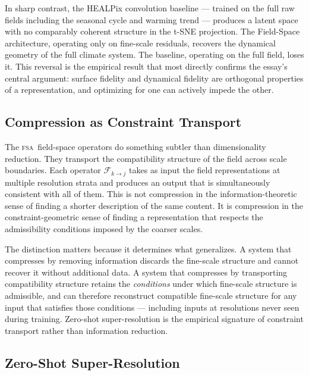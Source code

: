 \documentclass[11pt,a4paper]{article}
\theoremstyle{plain}
\theoremstyle{definition}
\theoremstyle{remark}
\newcommand{\FSA}{\textup{\textsc{fsa}}}
\begin{document}
In sharp contrast, the HEALPix convolution baseline --- trained on the full
raw fields including the seasonal cycle and warming trend --- produces a
latent space with no comparably coherent structure in the t-SNE projection.
The Field-Space architecture, operating only on fine-scale residuals,
recovers the dynamical geometry of the full climate system. The baseline,
operating on the full field, loses it. This reversal is the empirical result
that most directly confirms the essay's central argument: surface fidelity
and dynamical fidelity are orthogonal properties of a representation, and
optimizing for one can actively impede the other.

\subsection{Compression as Constraint Transport}

The \FSA\ field-space operators do something subtler than dimensionality
reduction. They transport the compatibility structure of the field across
scale boundaries. Each operator $\mathcal{F}_{k \to j}$ takes as input the
field representations at multiple resolution strata and produces an output
that is simultaneously consistent with all of them. This is not compression
in the information-theoretic sense of finding a shorter description of the
same content. It is compression in the constraint-geometric sense of finding
a representation that respects the admissibility conditions imposed by the
coarser scales.

The distinction matters because it determines what generalizes. A system
that compresses by removing information discards the fine-scale structure
and cannot recover it without additional data. A system that compresses by
transporting compatibility structure retains the \textit{conditions} under
which fine-scale structure is admissible, and can therefore reconstruct
compatible fine-scale structure for any input that satisfies those conditions
--- including inputs at resolutions never seen during training. Zero-shot
super-resolution is the empirical signature of constraint transport rather
than information reduction.

\subsection{Zero-Shot Super-Resolution}
\end{document}
